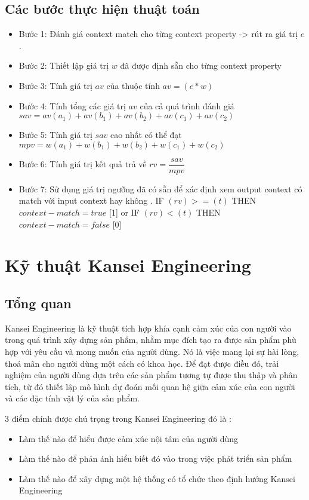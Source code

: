 \subsection{Các bước thực hiện thuật toán }	
 \begin{itemize}
\item Bước 1: Đánh giá context match cho từng context property -> rút ra giá trị $e$ . 
\item Bước 2: Thiết lập giá trị $w$ đã được định sẵn cho từng context property
\item Bước 3: Tính giá trị $av$ của thuộc tính $av = (e* w)$
\item Bước 4: Tính tổng các giá trị $av$ của cả quá trình đánh giá $sav = av(a_1) + av(b_1) + av(b_2) + av(c_1) + av(c_2)$
\item Bước 5: Tính giá trị $sav$ cao nhất có thể đạt $mpv = w(a_1) + w(b_1) +w(b_2) + w(c_1) + w(c_2)$
\item Bước 6: Tính giá trị kết quả trả về $rv = \dfrac{sav}{mpv}$
\item Bước 7: Sử dụng giá trị ngưỡng đã có sẵn để xác định xem output context có match với input context hay không . IF $(rv) >= (t)$ THEN $context-match = true$ [1] or IF $(rv) < (t)$ THEN $context-match = false$ [0]
 \end{itemize}
\section{Kỹ thuật Kansei Engineering}

\subsection{Tổng quan}
\label{KanseiTheory}
Kansei Engineering là kỹ thuật tích hợp khía cạnh cảm xúc của con người vào trong quá trình xây dựng sản phẩm, nhằm mục đích tạo ra được sản phẩm phù hợp với yêu cầu và mong muốn của người dùng. Nó là việc mang lại sự hài lòng, thoả mãn cho người dùng một cách có khoa học. Để đạt được điều đó, trải nghiệm của người dùng dựa trên các sản phẩm tương tự được thu thập và phân tích, từ đó thiết lập mô hình dự đoán mối quan hệ giữa cảm xúc của con người và các đặc tính vật lý của sản phẩm.

3 điểm chính được chú trọng trong Kansei Engineering đó là :
\begin{itemize}
	\item Làm thế nào để hiểu được cảm xúc nội tâm của người dùng
	\item Làm thế nào để phản ánh hiểu biết đó vào trong việc phát triển sản phẩm
	\item Làm thế nào để xây dựng một hệ thống có tổ chức theo định hướng Kansei Engineering
\end{itemize}

